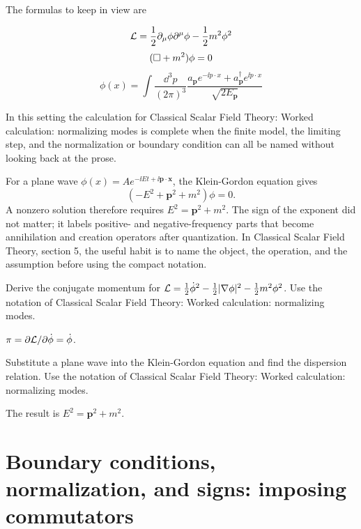 The formulas to keep in view are

\[
  \mathcal L=\frac12\partial_\mu\phi\partial^\mu\phi-\frac12m^2\phi^2
\]
\[
  (\Box+m^2)\phi=0
\]
\[
  \phi(x)=\int\frac{\dd^3p}{(2\pi)^3}\frac{a_{\bm p}e^{-\ii p\cdot x}+a_{\bm p}^\dagger e^{\ii p\cdot x}}{\sqrt{2E_{\bm p}}}
\]

In this setting the calculation for Classical Scalar Field Theory: Worked calculation: normalizing modes is complete when the finite model, the limiting step, and the normalization or boundary condition can all be named without looking back at the prose.




\begin{example}
For a plane wave \(\phi(x)=Ae^{-\ii Et+\ii\bm p\cdot\bm x}\), the Klein-Gordon equation gives
\[
  (-E^2+\bm p^2+m^2)\phi=0.
\]
A nonzero solution therefore requires \(E^2=\bm p^2+m^2\).  The sign of the exponent did not matter; it labels positive- and negative-frequency parts that become annihilation and creation operators after quantization.  In Classical Scalar Field Theory, section 5, the useful habit is to name the object, the operation, and the assumption before using the compact notation.
\end{example}



\begin{exercise}
Derive the conjugate momentum for \(\mathcal L=\frac12\dot\phi^2-\frac12|\nabla\phi|^2-\frac12m^2\phi^2\).  Use the notation of Classical Scalar Field Theory: Worked calculation: normalizing modes.
\begin{answer}
\(\pi=\partial\mathcal L/\partial\dot\phi=\dot\phi\).
\end{answer}
\end{exercise}

\begin{exercise}
Substitute a plane wave into the Klein-Gordon equation and find the dispersion relation.  Use the notation of Classical Scalar Field Theory: Worked calculation: normalizing modes.
\begin{answer}
The result is \(E^2=\bm p^2+m^2\).
\end{answer}
\end{exercise}



\section{Boundary conditions, normalization, and signs: imposing commutators}

